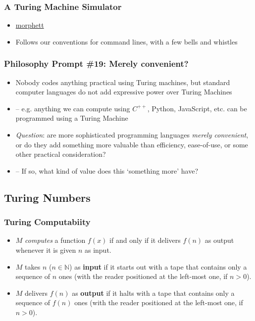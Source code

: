 \begin{frame}
\frametitle{A Turing Machine Simulator}

\begin{itemize}[<+->]

\item \href{http://morphett.info/turing/}{morphett}

\item Follows our conventions for command lines, with a few bells and whistles 

\end{itemize}
\end{frame}

\begin{frame}
\frametitle{Philosophy Prompt \#19: Merely convenient?}

\begin{itemize}[<+->]

\item Nobody codes anything practical using Turing machines, but standard computer languages do not add expressive power over Turing Machines

\item[] -- e.g. anything we can compute using $C^{++}$, Python, JavaScript, etc. can be programmed using a Turing Machine

\item \emph{Question}: are more sophisticated programming languages \textit{merely convenient}, or do they add something more valuable than efficiency, ease-of-use, or some other practical consideration?

\item[] -- If so, what kind of value does this `something more' have?


\end{itemize}
\end{frame}

\subsection{Turing Numbers}

\begin{frame}
\frametitle{Turing Computabiity}

\begin{itemize}[<+->]

\item $M$ \emph{computes} a function \(f(x)\) if and only if it delivers \(f(n)\) as output whenever it is given $n$ as input.


\item $M$ takes \(n\) ($n \in \mathbb{N}$) as \textbf{input} if it starts out with a tape that contains only a sequence of \(n\) ones (with the reader positioned at the left-most one, if $n > 0$).

\item  $M$ delivers \(f(n)\) as \textbf{output} if it halts with a tape that contains only a sequence of \(f(n)\) ones (with the reader positioned at the left-most one, if $n > 0$).


\end{itemize}
\end{frame}

